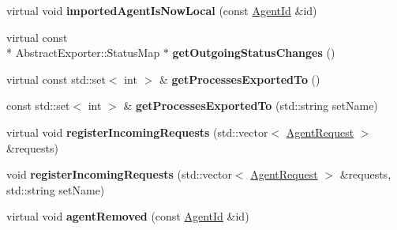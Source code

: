 \begin{DoxyCompactItemize}
\item 
\hypertarget{classrepast_1_1_importer_exporter___b_y___s_e_t_a84b98ad04ccb7ce97184377074995644}{virtual void {\bfseries imported\-Agent\-Is\-Now\-Local} (const \hyperlink{classrepast_1_1_agent_id}{Agent\-Id} \&id)}\label{classrepast_1_1_importer_exporter___b_y___s_e_t_a84b98ad04ccb7ce97184377074995644}

\item 
\hypertarget{classrepast_1_1_importer_exporter___b_y___s_e_t_ad44c849f9ffb2832a18cbc2c68ad6999}{virtual const \\*
Abstract\-Exporter\-::\-Status\-Map $\ast$ {\bfseries get\-Outgoing\-Status\-Changes} ()}\label{classrepast_1_1_importer_exporter___b_y___s_e_t_ad44c849f9ffb2832a18cbc2c68ad6999}

\item 
\hypertarget{classrepast_1_1_importer_exporter___b_y___s_e_t_af4e397c2d5ff57899c68dc2d5d8259cb}{virtual const std\-::set$<$ int $>$ \& {\bfseries get\-Processes\-Exported\-To} ()}\label{classrepast_1_1_importer_exporter___b_y___s_e_t_af4e397c2d5ff57899c68dc2d5d8259cb}

\item 
\hypertarget{classrepast_1_1_importer_exporter___b_y___s_e_t_a578132700de4662efb239677c9c335bb}{const std\-::set$<$ int $>$ \& {\bfseries get\-Processes\-Exported\-To} (std\-::string set\-Name)}\label{classrepast_1_1_importer_exporter___b_y___s_e_t_a578132700de4662efb239677c9c335bb}

\item 
\hypertarget{classrepast_1_1_importer_exporter___b_y___s_e_t_ae7de9ae6a65eeb2c156bba1a1add61d6}{virtual void {\bfseries register\-Incoming\-Requests} (std\-::vector$<$ \hyperlink{classrepast_1_1_agent_request}{Agent\-Request} $>$ \&requests)}\label{classrepast_1_1_importer_exporter___b_y___s_e_t_ae7de9ae6a65eeb2c156bba1a1add61d6}

\item 
\hypertarget{classrepast_1_1_importer_exporter___b_y___s_e_t_afc2f89de3a127c49597e1abc8f84c77e}{void {\bfseries register\-Incoming\-Requests} (std\-::vector$<$ \hyperlink{classrepast_1_1_agent_request}{Agent\-Request} $>$ \&requests, std\-::string set\-Name)}\label{classrepast_1_1_importer_exporter___b_y___s_e_t_afc2f89de3a127c49597e1abc8f84c77e}

\item 
\hypertarget{classrepast_1_1_importer_exporter___b_y___s_e_t_ab451be52b3ce98e129fe07d064c8f1d0}{virtual void {\bfseries agent\-Removed} (const \hyperlink{classrepast_1_1_agent_id}{Agent\-Id} \&id)}\label{classrepast_1_1_importer_exporter___b_y___s_e_t_ab451be52b3ce98e129fe07d064c8f1d0}


\end{DoxyCompactItemize}
